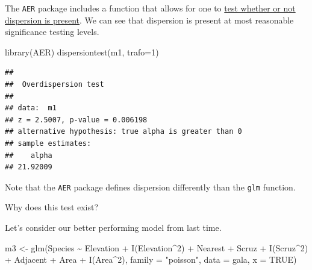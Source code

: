 \documentclass[
  ignorenonframetext,
]{beamer}
\newenvironment{Shaded}{\begin{snugshade}}{\end{snugshade}}
\newcommand{\AttributeTok}[1]{\textcolor[rgb]{0.77,0.63,0.00}{#1}}
\newcommand{\ConstantTok}[1]{\textcolor[rgb]{0.00,0.00,0.00}{#1}}
\newcommand{\DecValTok}[1]{\textcolor[rgb]{0.00,0.00,0.81}{#1}}
\newcommand{\FunctionTok}[1]{\textcolor[rgb]{0.00,0.00,0.00}{#1}}
\newcommand{\NormalTok}[1]{#1}
\newcommand{\OtherTok}[1]{\textcolor[rgb]{0.56,0.35,0.01}{#1}}
\newcommand{\SpecialCharTok}[1]{\textcolor[rgb]{0.00,0.00,0.00}{#1}}
\newcommand{\StringTok}[1]{\textcolor[rgb]{0.31,0.60,0.02}{#1}}
\begin{document}
\begin{frame}[fragile]{}
\protect\hypertarget{section-8}{}
The \texttt{AER} package includes a function that allows for one to
\href{https://www.sciencedirect.com/science/article/abs/pii/030440769090014K}{test
whether or not dispersion is present}. We can see that dispersion is
present at most reasonable significance testing levels.

\vspace{12pt}
\tiny

\begin{Shaded}
\begin{Highlighting}[]
\FunctionTok{library}\NormalTok{(AER)}
\FunctionTok{dispersiontest}\NormalTok{(m1, }\AttributeTok{trafo=}\DecValTok{1}\NormalTok{)}
\end{Highlighting}
\end{Shaded}

\begin{verbatim}
## 
##  Overdispersion test
## 
## data:  m1
## z = 2.5007, p-value = 0.006198
## alternative hypothesis: true alpha is greater than 0
## sample estimates:
##    alpha 
## 21.92009
\end{verbatim}

\vspace{12pt}
\normalsize

Note that the \texttt{AER} package defines dispersion differently than
the \texttt{glm} function.

\vspace{12pt}

Why does this test exist?
\end{frame}

\begin{frame}[fragile]{}
\protect\hypertarget{section-9}{}
Let's consider our better performing model from last time.

\vspace{12pt}
\tiny

\begin{Shaded}
\begin{Highlighting}[]
\NormalTok{m3 }\OtherTok{\textless{}{-}} \FunctionTok{glm}\NormalTok{(Species }\SpecialCharTok{\textasciitilde{}}\NormalTok{ Elevation }\SpecialCharTok{+} \FunctionTok{I}\NormalTok{(Elevation}\SpecialCharTok{\^{}}\DecValTok{2}\NormalTok{) }\SpecialCharTok{+}\NormalTok{ Nearest }\SpecialCharTok{+}\NormalTok{ Scruz }\SpecialCharTok{+} 
            \FunctionTok{I}\NormalTok{(Scruz}\SpecialCharTok{\^{}}\DecValTok{2}\NormalTok{) }\SpecialCharTok{+}\NormalTok{ Adjacent }\SpecialCharTok{+} 
\NormalTok{            Area }\SpecialCharTok{+} \FunctionTok{I}\NormalTok{(Area}\SpecialCharTok{\^{}}\DecValTok{2}\NormalTok{), }\AttributeTok{family =} \StringTok{"poisson"}\NormalTok{, }\AttributeTok{data =}\NormalTok{ gala, }\AttributeTok{x =} \ConstantTok{TRUE}\NormalTok{)}
\end{Highlighting}
\end{Shaded}
\end{frame}
\end{document}
